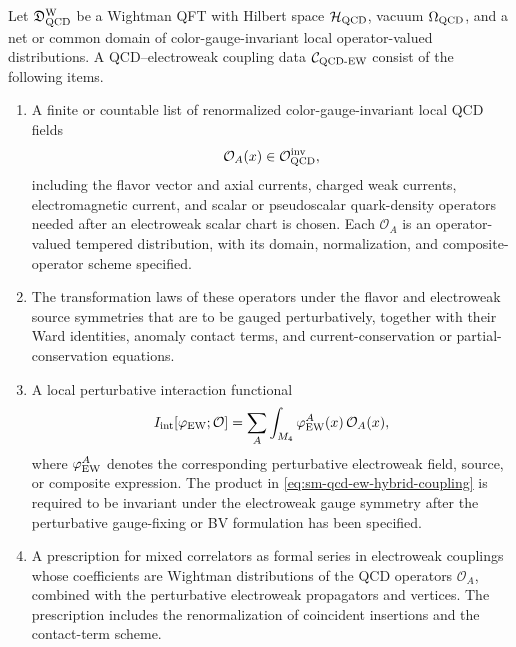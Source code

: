 \begin{definition}
\label{def:sm-qcd-ew-coupling-data}
Let \(\mathfrak D_{\rm QCD}^{\rm W}\) be a Wightman QFT with Hilbert space
\(\mathcal H_{\rm QCD}\), vacuum \(\Omega_{\rm QCD}\), and a net or common
domain of color-gauge-invariant local operator-valued distributions.  A
QCD--electroweak coupling data \(\mathcal C_{\rm QCD\text{-}EW}\) consist
of the following items.
\begin{enumerate}
\item A finite or countable list of renormalized color-gauge-invariant local
      QCD fields
      \[
        \mathcal O_A(x)\in\mathcal O_{\rm QCD}^{\rm inv},
      \]
      including the flavor vector and axial currents, charged weak currents,
      electromagnetic current, and scalar or pseudoscalar quark-density
      operators needed after an electroweak scalar chart is chosen.  Each
      \(\mathcal O_A\) is an operator-valued tempered distribution, with its
      domain, normalization, and composite-operator scheme specified.
\item The transformation laws of these operators under the flavor and
      electroweak source symmetries that are to be gauged perturbatively,
      together with their Ward identities, anomaly contact terms, and
      current-conservation or partial-conservation equations.
\item A local perturbative interaction functional
      \begin{equation}
        I_{\rm int}[\varphi_{\rm EW};\mathcal O]
        =
        \sum_A \int_{M_4}\varphi_{\rm EW}^A(x)\,\mathcal O_A(x),
        \label{eq:sm-qcd-ew-hybrid-coupling}
      \end{equation}
      where \(\varphi_{\rm EW}^A\) denotes the corresponding perturbative
      electroweak field, source, or composite expression.  The product in
      \eqref{eq:sm-qcd-ew-hybrid-coupling} is required to be invariant under
      the electroweak gauge symmetry after the perturbative gauge-fixing or BV
      formulation has been specified.
\item A prescription for mixed correlators as formal series in electroweak
      couplings whose coefficients are Wightman distributions of the QCD
      operators \(\mathcal O_A\), combined with the perturbative electroweak
      propagators and vertices.  The prescription includes the renormalization
      of coincident insertions and the contact-term scheme.
\end{enumerate}
\end{definition}

